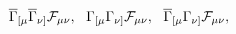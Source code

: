 \begin{equation}
\overline{\Gamma}_{[\mu}\overline{\Gamma}_{\nu]}{\cal F}_{\mu\nu}
,~~ \Gamma_{[\mu}\Gamma_{\nu]}{\cal F}_{\mu\nu}
,~~\overline{\Gamma}_{[\mu}\Gamma_{\nu]}{\cal F}_{\mu\nu} ,
\label{91}
\end{equation}

